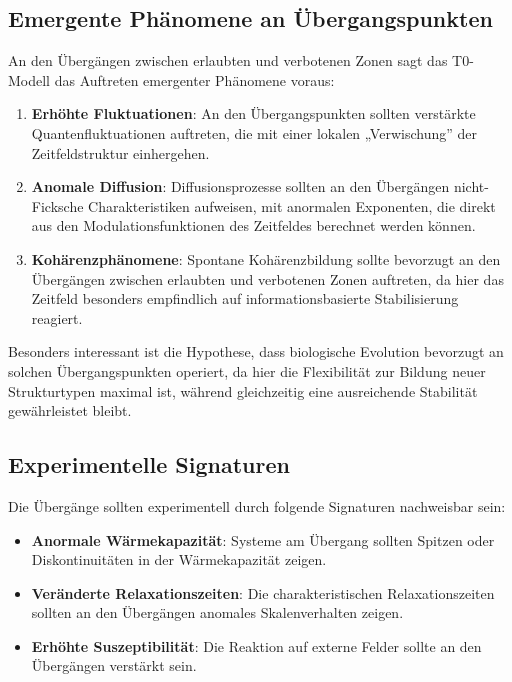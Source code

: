 \documentclass[12pt,a4paper]{article}
\begin{document}
	\subsection{Emergente Phänomene an Übergangspunkten}
	
	An den Übergängen zwischen erlaubten und verbotenen Zonen sagt das T0-Modell das Auftreten emergenter Phänomene voraus:
	
	\begin{enumerate}
		\item \textbf{Erhöhte Fluktuationen}: An den Übergangspunkten sollten verstärkte Quantenfluktuationen auftreten, die mit einer lokalen „Verwischung'' der Zeitfeldstruktur einhergehen.
		
		\item \textbf{Anomale Diffusion}: Diffusionsprozesse sollten an den Übergängen nicht-Ficksche Charakteristiken aufweisen, mit anormalen Exponenten, die direkt aus den Modulationsfunktionen des Zeitfeldes berechnet werden können.
		
		\item \textbf{Kohärenzphänomene}: Spontane Kohärenzbildung sollte bevorzugt an den Übergängen zwischen erlaubten und verbotenen Zonen auftreten, da hier das Zeitfeld besonders empfindlich auf informationsbasierte Stabilisierung reagiert.
	\end{enumerate}
	
	Besonders interessant ist die Hypothese, dass biologische Evolution bevorzugt an solchen Übergangspunkten operiert, da hier die Flexibilität zur Bildung neuer Strukturtypen maximal ist, während gleichzeitig eine ausreichende Stabilität gewährleistet bleibt.
	
	\subsection{Experimentelle Signaturen}
	
	Die Übergänge sollten experimentell durch folgende Signaturen nachweisbar sein:
	
	\begin{itemize}
		\item \textbf{Anormale Wärmekapazität}: Systeme am Übergang sollten Spitzen oder Diskontinuitäten in der Wärmekapazität zeigen.
		
		\item \textbf{Veränderte Relaxationszeiten}: Die charakteristischen Relaxationszeiten sollten an den Übergängen anomales Skalenverhalten zeigen.
		
		\item \textbf{Erhöhte Suszeptibilität}: Die Reaktion auf externe Felder sollte an den Übergängen verstärkt sein.
	\end{itemize}
	
\end{document}
